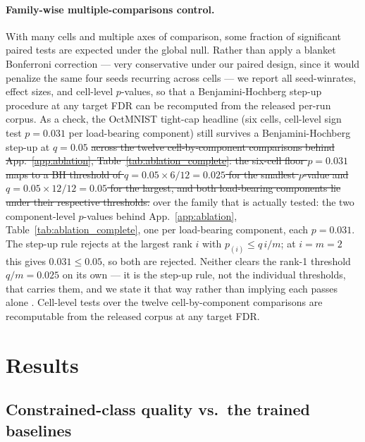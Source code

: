 \documentclass[10pt]{article}
\newcommand{\del}[1]{{\color{red}\sout{#1}}}
\begin{document}
\paragraph{Family-wise multiple-comparisons control.}
With many cells and multiple axes of comparison, some fraction of significant
paired tests are expected under the global null. Rather than apply a blanket
Bonferroni correction --- very conservative under our paired design, since it
would penalize the same four seeds recurring across cells --- we report all
seed-winrates, effect sizes, and cell-level $p$-values, so that a
Benjamini-Hochberg step-up procedure at any target FDR can be recomputed from
the released per-run corpus. As a check, the OctMNIST tight-cap headline
(six cells, cell-level sign test $p\!=\!0.031$ per load-bearing component)
still survives a Benjamini-Hochberg step-up at $q\!=\!0.05$
\del{across the twelve
cell-by-component comparisons behind {\color{blue}App.~\ref{app:ablation}, }Table~\ref{tab:ablation_complete}: the
six-cell floor $p\!=\!0.031$ maps to a BH threshold of $q\!=\!0.05\times
6/12 = 0.025$ for the smallest $p$-value and $q\!=\!0.05\times 12/12 = 0.05$
for the largest, and both load-bearing components lie under their respective
thresholds.}%
{\color{blue}over the family that is actually tested: the two component-level
$p$-values behind {\color{blue}App.~\ref{app:ablation}, }Table~\ref{tab:ablation_complete}, one per load-bearing
component, each $p\!=\!0.031$. The step-up rule rejects at the largest rank $i$
with $p_{(i)}\!\le\!q\,i/m$; at $i\!=\!m\!=\!2$ this gives
$0.031\!\le\!0.05$, so both are rejected. Neither clears the rank-1 threshold
$q/m\!=\!0.025$ on its own --- it is the step-up rule, not the individual
thresholds, that carries them, and we state it that way rather than implying
each passes alone \citep{benjamini1995controlling}. Cell-level tests over the
twelve cell-by-component comparisons are recomputable from the released corpus
at any target FDR.}

\section{Results}
\label{sec:results}

\subsection{Constrained-class quality vs.\ the trained baselines}
\label{sec:oct}
\end{document}
